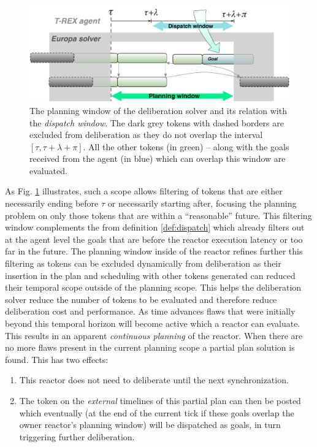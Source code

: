 \begin{figure}[!htbp]
  \centering
  \includegraphics[width=0.65\columnwidth]{figs/plan_window}
  \caption{\small The planning window of the deliberation solver and its
    relation with the {\em dispatch window}. The dark grey
    tokens   with dashed borders are excluded from deliberation as they do not
    overlap the interval $[\tau, \tau+\lambda+\pi]$. All the other
    tokens (in {\color{green} green}) -- along with the goals received from the
    agent (in {\color{blue} blue}) which can overlap this window are
    evaluated.}
  \label{fig:plan:window}
\end{figure}


As Fig. \ref{fig:plan:window} illustrates,  such a
scope allows filtering of tokens that are either necessarily ending
before $\tau$ or necessarily starting after, focusing the planning
problem on only those tokens that are within a ``reasonable''
future. This filtering window complements the  from definition \ref{def:dispatch} which already filters
out at the agent level the goals that are before the reactor execution
latency or too far in the future. The planning window inside of the
reactor refines further this filtering as tokens can be excluded
dynamically from deliberation as their insertion in the plan and
scheduling with other tokens generated can reduced their temporal
scope outside of the planning scope. This helps the deliberation 
solver reduce the number of tokens to be evaluated and therefore
reduce deliberation cost and performance. As time advances flaws that
were initially beyond this temporal horizon will become active which a
reactor can evaluate. This results in an apparent \emph{continuous
  planning} of the reactor. When there are no more flaws present in
the current planning scope a partial plan solution is found. This has
two effects:

\begin{enumerate}

\item This reactor does not need to deliberate until the next
  synchronization. 

\item The token on the {\em external} timelines of this partial plan
  can then be posted which eventually (at the end of the current tick
  if these goals overlap the owner reactor's planning window) will be
  dispatched as goals, in turn triggering further deliberation.

\end{enumerate}


